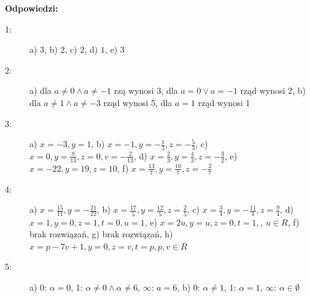 \documentclass{article}
\begin{document}
\newpage
\textbf{Odpowiedzi:}
\begin{description}
    \item [1:] a) $3$, b) $2$, c) $2$, d) $1$, e) $3$
    \item [2:] a) dla $a \neq 0 \wedge a \neq -1$ rzą wynosi 3, dla $a=0 \vee a=-1$ rząd wynosi 2, b) dla $a \neq 1 \wedge a \neq -3$ rząd wynosi 5, dla $a=1$ rząd wynosi 1
    \item [3:] a) $x=-3, y=1$, b) $x=-1, y=-\frac{1}{3},z=-\frac{5}{3}$, c) $x=0,y=\frac{8}{13}, z=0, v=-\frac{2}{13}$, d) $x=\frac{2}{3}, y=\frac{4}{3},z=-\frac{3}{2}$, e) $x=-22, y = 19, z = 10$, f) $x=\frac{13}{7}, y=\frac{10}{7},z=-\frac{2}{7}$
    \item [4:] a) $x=\frac{15}{11}, y=-\frac{21}{22}$, b) $x=\frac{17}{5},
    y=\frac{12}{5},z=\frac{2}{5}$, c) $x=\frac{3}{4},y=-\frac{11}{4},
    z=\frac{9}{4}$, d) $x=1,y=0,z=1,t=0,u=1$, e) $x = 2u, y = u, z = 0, t = 1,
    ,\ u \in R$, f) brak rozwiązań, g) brak rozwiązań, h) $x = p - 7v + 1, y = 0, z = v, t = p, p, v \in R$
    \item [5:] a) 0: $\alpha = 0$, 1: $\alpha \neq 0 \wedge \alpha \neq 6 $, $\infty$: $a=6$, b) 0: $\alpha \neq 1$, 1: $\alpha = 1$, $\infty$: $\alpha \in \emptyset $
\end{description}
\end{document}
